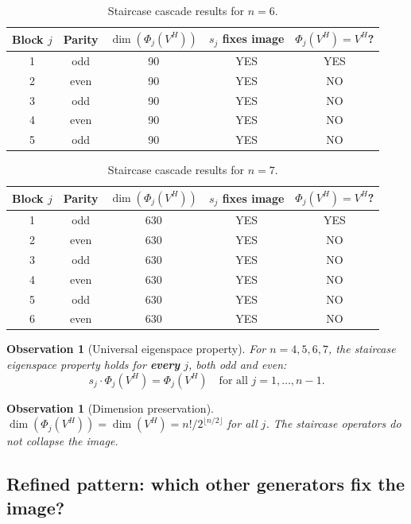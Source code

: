 \documentclass[12pt]{article}
\newtheorem{observation}[theorem]{Observation}
\theoremstyle{definition}
\begin{document}
\begin{table}[h]
\centering
\caption{Staircase cascade results for $n=6$.}
\begin{tabular}{ccccc}
\toprule
Block $j$ & Parity & $\dim(\Phi_j(V^H))$ & $s_j$ fixes image & $\Phi_j(V^H) = V^H$? \\
\midrule
1 & odd  & 90 & YES & YES \\
2 & even & 90 & YES & NO \\
3 & odd  & 90 & YES & NO \\
4 & even & 90 & YES & NO \\
5 & odd  & 90 & YES & NO \\
\bottomrule
\end{tabular}
\end{table}

\begin{table}[h]
\centering
\caption{Staircase cascade results for $n=7$.}
\begin{tabular}{ccccc}
\toprule
Block $j$ & Parity & $\dim(\Phi_j(V^H))$ & $s_j$ fixes image & $\Phi_j(V^H) = V^H$? \\
\midrule
1 & odd  & 630 & YES & YES \\
2 & even & 630 & YES & NO \\
3 & odd  & 630 & YES & NO \\
4 & even & 630 & YES & NO \\
5 & odd  & 630 & YES & NO \\
6 & even & 630 & YES & NO \\
\bottomrule
\end{tabular}
\end{table}

\begin{observation}[Universal eigenspace property]
  For $n = 4, 5, 6, 7$, the staircase eigenspace property holds for \textbf{every} $j$, both odd and even:
  \[
    s_j \cdot \Phi_j(V^H) = \Phi_j(V^H) \quad \text{for all } j = 1, \ldots, n-1.
  \]
\end{observation}

\begin{observation}[Dimension preservation]
  $\dim(\Phi_j(V^H)) = \dim(V^H) = n!/2^{\lfloor n/2 \rfloor}$ for all $j$.
  The staircase operators do not collapse the image.
\end{observation}

\subsection{Refined pattern: which other generators fix the image?}
\end{document}
